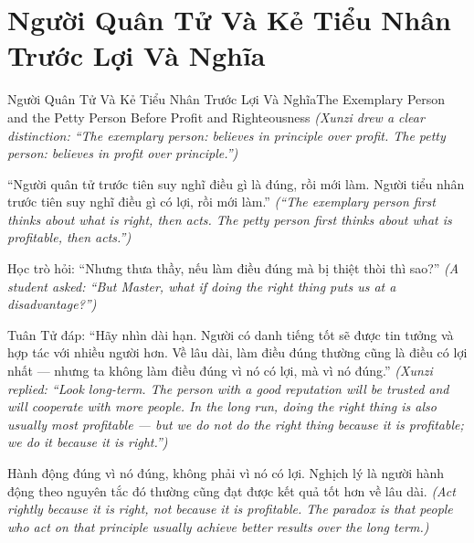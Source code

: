 \section{Người Quân Tử Và Kẻ Tiểu Nhân Trước Lợi Và Nghĩa}
\begin{truyen}{Người Quân Tử Và Kẻ Tiểu Nhân Trước Lợi Và Nghĩa}{The Exemplary Person and the Petty Person Before Profit and Righteousness}
\textit{(Xunzi drew a clear distinction: ``The exemplary person: believes in principle over profit. The petty person: believes in profit over principle.'')}

``Người quân tử trước tiên suy nghĩ điều gì là đúng, rồi mới làm. Người tiểu nhân trước tiên suy nghĩ điều gì có lợi, rồi mới làm.''
\textit{(``The exemplary person first thinks about what is right, then acts. The petty person first thinks about what is profitable, then acts.'')}

Học trò hỏi: ``Nhưng thưa thầy, nếu làm điều đúng mà bị thiệt thòi thì sao?''
\textit{(A student asked: ``But Master, what if doing the right thing puts us at a disadvantage?'')}

Tuân Tử đáp: ``Hãy nhìn dài hạn. Người có danh tiếng tốt sẽ được tin tưởng và hợp tác với nhiều người hơn. Về lâu dài, làm điều đúng thường cũng là điều có lợi nhất — nhưng ta không làm điều đúng vì nó có lợi, mà vì nó đúng.''
\textit{(Xunzi replied: ``Look long-term. The person with a good reputation will be trusted and will cooperate with more people. In the long run, doing the right thing is also usually most profitable — but we do not do the right thing because it is profitable; we do it because it is right.'')}

\end{truyen}

\begin{baihoc}
Hành động đúng vì nó đúng, không phải vì nó có lợi. Nghịch lý là người hành động theo nguyên tắc đó thường cũng đạt được kết quả tốt hơn về lâu dài.
\textit{(Act rightly because it is right, not because it is profitable. The paradox is that people who act on that principle usually achieve better results over the long term.)}
\end{baihoc}
\ngancach

